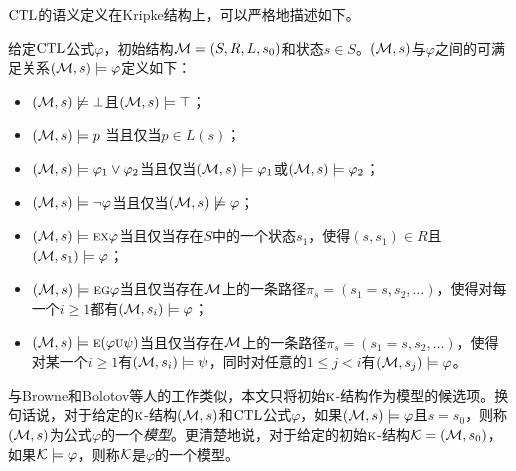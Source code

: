 $\textrm{CTL}$的语义定义在Kripke结构上，可以严格地描述如下。
\begin{definition}\label{def:ctl:semantic}
	给定$\textrm{CTL}$公式$\varphi$，初始结构${\cal M}=(S,R,L,s_0)$和状态$s\in S$。$({\cal M},s)$与$\varphi$之间的可满足关系$({\cal M},s)\models \varphi$定义如下：
	\begin{itemize}
		\item $({\cal M},s) \not \models \bot$且$({\cal M}, s) \models \top$；
		\item $({\cal M},s)\models p$ 当且仅当$p\in L(s)$；
		\item $({\cal M},s) \models \varphi_1 \vee \varphi_2$当且仅当$({\cal M},s)\models \varphi_1$或$({\cal M},s)\models \varphi_2$；
		\item $({\cal M},s)\models \neg \varphi$当且仅当$({\cal M},s)\not \models \varphi$；
		\item $({\cal M},s)\models \textsc{e}\textsc{x} \varphi$当且仅当存在$S$中的一个状态$s_1$，使得$(s,s_1)\in R$且$({\cal M},s_1)\models \varphi$；
		\item $({\cal M},s)\models \textsc{e}\textsc{g}\varphi$当且仅当存在${\cal M}$上的一条路径$\pi_s=(s_1=s, s_2,\dots)$，使得对每一个$i\ge 1$都有$({\cal M},s_i)\models \varphi$；
		\item $({\cal M},s)\models \textsc{e}(\varphi \textsc{u} \psi)$当且仅当存在${\cal M}$上的一条路径$\pi_s=(s_1=s, s_2,\dots)$，使得对某一个$i\ge 1$有$({\cal M},s_i)\models \psi$，同时对任意的$1\leq j < i$有$({\cal M},s_j)\models \varphi$。
	\end{itemize}
\end{definition}


与Browne和Bolotov等人的工作类似，本文只将初始$\textsc{k}$-结构作为模型的候选项\cite{browne1988characterizing,Bolotov:1999:JETAI}。换句话说，对于给定的$\textsc{k}$-结构$({\cal M},s)$和$\textrm{CTL}$公式$\varphi$，如果$({\cal M},s)\models \varphi$且$s = s_0$，则称$({\cal M},s)$为公式$\varphi$的一个\emph{模型}。更清楚地说，对于给定的初始$\textsc{k}$-结构${\cal K}=({\cal M},s_0)$，如果${\cal K} \models \varphi$，则称$\cal K$是$\varphi$的一个模型。

